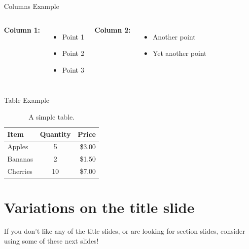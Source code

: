 \documentclass[aspectratio=169]{beamer} %
\begin{document}
	\begin{frame}{Columns Example}
		\begin{columns}
			\textbf{Column 1:} \\
			\begin{itemize}[label=\textbullet] 
				\item Point 1
				\item Point 2
				\item Point 3
			\end{itemize}
			\textbf{Column 2:} \\
			\begin{itemize}[label=\textbullet] 
				\item Another point
				\item Yet another point
			\end{itemize}
		\end{columns}
	\end{frame}
	
	\begin{frame}{Table Example}
		\begin{table}
			\centering
			\begin{tabular}{l c r}
				\toprule
				Item & Quantity & Price \\
				\midrule
				Apples & 5 & \$3.00 \\
				Bananas & 2 & \$1.50 \\
				Cherries & 10 & \$7.00 \\
				\bottomrule
			\end{tabular}
			\caption{A simple table.}
		\end{table}
	\end{frame}


\section{Variations on the title slide}
\begin{frame}
	If you don't like any of the title slides, or are looking for section slides, consider using some of these next slides!
\end{frame}
\end{document}
